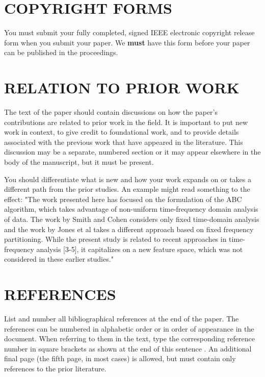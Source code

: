 \documentclass[letterpaper, 11 pt, twoside, conference]{ieeeconf}
\begin{document}

\section{COPYRIGHT FORMS}
\label{sec:copyright}

You must submit your fully completed, signed IEEE electronic copyright release
form when you submit your paper. We {\bf must} have this form before your paper
can be published in the proceedings.

\section{RELATION TO PRIOR WORK}
\label{sec:prior}

The text of the paper should contain discussions on how the paper's
contributions are related to prior work in the field. It is important
to put new work in  context, to give credit to foundational work, and
to provide details associated with the previous work that have appeared
in the literature. This discussion may be a separate, numbered section
or it may appear elsewhere in the body of the manuscript, but it must
be present.

You should differentiate what is new and how your work expands on
or takes a different path from the prior studies. An example might
read something to the effect: "The work presented here has focused
on the formulation of the ABC algorithm, which takes advantage of
non-uniform time-frequency domain analysis of data. The work by
Smith and Cohen  considers only fixed time-domain analysis and
the work by Jones et al  takes a different approach based on
fixed frequency partitioning. While the present study is related
to recent approaches in time-frequency analysis [3-5], it capitalizes
on a new feature space, which was not considered in these earlier
studies."

\vfill\pagebreak

\section{REFERENCES}
\label{sec:refs}

List and number all bibliographical references at the end of the
paper. The references can be numbered in alphabetic order or in
order of appearance in the document. When referring to them in
the text, type the corresponding reference number in square
brackets as shown at the end of this sentence \cite{Chai1999}. An
additional final page (the fifth page, in most cases) is
allowed, but must contain only references to the prior
literature.



\end{document}

